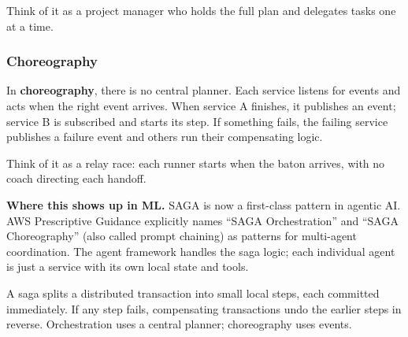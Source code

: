 \documentclass[a4paper,11pt]{article}
\newcommand{\vocab}[1]{\textbf{\color{navy}#1}}
\begin{document}
Think of it as a project manager who holds the full plan and delegates tasks one at a time.

\subsubsection{Choreography}

In \vocab{choreography}, there is no central planner.
Each service listens for events and acts when the right event arrives.
When service A finishes, it publishes an event; service B is subscribed and starts its step.
If something fails, the failing service publishes a failure event and others run their compensating logic.

Think of it as a relay race: each runner starts when the baton arrives, with no coach directing each handoff.

\begin{center}
\small
{}
\end{center}

\textbf{Where this shows up in ML.}
SAGA is now a first-class pattern in agentic AI.
AWS Prescriptive Guidance explicitly names ``SAGA Orchestration'' and ``SAGA Choreography'' (also called prompt chaining) as patterns for multi-agent coordination.
The agent framework handles the saga logic; each individual agent is just a service with its own local state and tools.

\begin{keytake}
A saga splits a distributed transaction into small local steps, each committed immediately.
If any step fails, compensating transactions undo the earlier steps in reverse.
Orchestration uses a central planner; choreography uses events.
\end{keytake}
\end{document}

